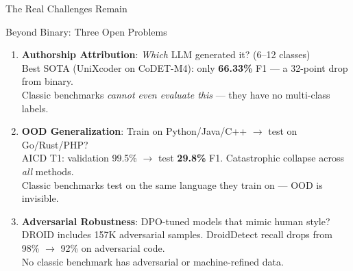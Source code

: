 \documentclass[aspectratio=169, 10pt]{beamer}
\begin{document}
\begin{frame}{The Real Challenges Remain}
\vspace{-0.15cm}

\begin{block}{Beyond Binary: Three Open Problems}
\small
\begin{enumerate}\setlength\itemsep{6pt}
    \item[\faUsers] \textbf{Authorship Attribution}: \emph{Which} LLM generated it? (6--12 classes)\\
    {\footnotesize Best SOTA (UniXcoder on CoDET-M4): only \textbf{66.33\%} F1 --- a 32-point drop from binary.\\
    Classic benchmarks \emph{cannot even evaluate this} --- they have no multi-class labels.}

    \item[\faGlobeAmericas] \textbf{OOD Generalization}: Train on Python/Java/C++ $\to$ test on Go/Rust/PHP?\\
    {\footnotesize AICD T1: validation 99.5\% $\to$ test \textbf{29.8\%} F1. Catastrophic collapse across \emph{all} methods.\\
    Classic benchmarks test on the same language they train on --- OOD is invisible.}

    \item[\faShield*] \textbf{Adversarial Robustness}: DPO-tuned models that mimic human style?\\
    {\footnotesize DROID includes 157K adversarial samples. DroidDetect recall drops from 98\% $\to$ 92\% on adversarial code.\\
    No classic benchmark has adversarial or machine-refined data.}
\end{enumerate}
\end{block}

\vspace{0.1cm}
\centering
{}
\end{frame}
\end{document}

